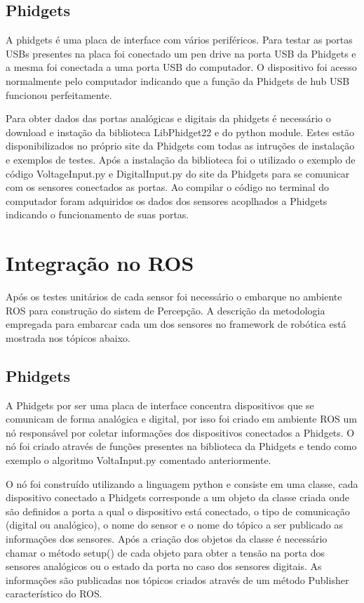     \subsection{Phidgets}
    
    A phidgets é uma placa de interface com vários periféricos. Para testar as portas USBs presentes na placa foi conectado um pen drive na porta USB da Phidgets e a mesma foi conectada a uma porta USB do computador. O dispositivo foi acesso normalmente pelo computador indicando que a função da Phidgets de hub USB funcionou perfeitamente.
    
    Para obter dados das portas analógicas e digitais da phidgets é necessário o download e instação da biblioteca LibPhidget22 e do python module. Estes estão disponibilizados no próprio site da Phidgets com todas as intruções de instalação e exemplos de testes. Após a instalação da biblioteca foi o utilizado o exemplo de código VoltageInput.py e DigitalInput.py do site da Phidgets para se comunicar com os sensores conectados as portas. Ao compilar o código no terminal do computador foram adquiridos os dados dos sensores acoplhados a Phidgets indicando o funcionamento de suas portas.
    
     \section{Integração no ROS}
     
     Após os testes unitários de cada sensor foi necessário o embarque no ambiente ROS para construção do sistem de Percepção. A descrição da metodologia empregada para embarcar cada um dos sensores no framework de robótica está mostrada nos tópicos abaixo.
     \subsection{Phidgets}
     A Phidgets por ser uma placa de interface concentra dispositivos que se comunicam de forma analógica e digital, por isso foi criado em ambiente ROS um nó responsável por coletar informações dos dispositivos conectados a Phidgets. O nó foi criado através de funções presentes na biblioteca da Phidgets e tendo como exemplo o algoritmo VoltaInput.py comentado anteriormente. 
     
     O nó foi construído utilizando a linguagem python e consiste em uma classe, cada dispositivo conectado a Phidgets corresponde a um objeto da classe criada onde são definidos a porta a qual o dispositivo está conectado, o tipo de comunicação (digital ou analógico), o nome do sensor e o nome do tópico a ser publicado as informações dos sensores. Após a criação dos objetos da classe é necessário chamar o método setup() de cada objeto para obter a tensão na porta dos sensores analógicos ou o estado da porta no caso dos sensores digitais. As informações são publicadas nos tópicos criados através de um método Publisher característico do ROS.
     
